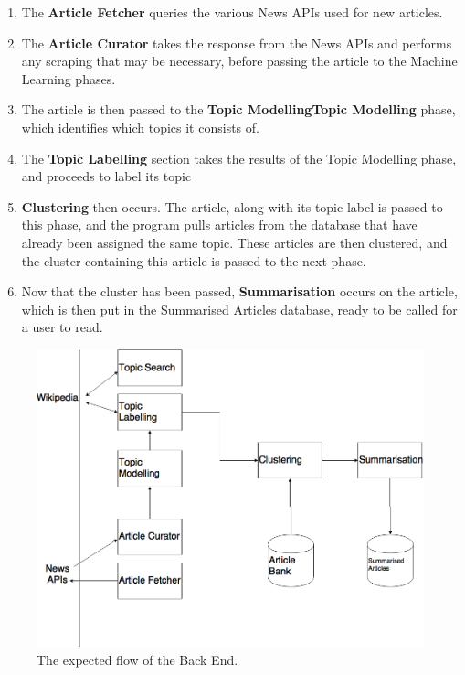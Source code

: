 \documentclass[12pt]{article}
\begin{document}
\begin{enumerate}
	\item The \textbf{Article Fetcher} queries the various News APIs used for new articles. \\
	\item The \textbf{Article Curator} takes the response from the News APIs and performs any scraping that may be necessary, before passing the article to the Machine Learning phases. \\
	\item The article is then passed to the \textbf{Topic Modelling}\textbf{Topic Modelling} phase, which identifies which topics it consists of. \\
	\item The \textbf{Topic Labelling} section takes the results of the Topic Modelling phase, and proceeds to label its topic \\
	\item \textbf{Clustering} then occurs. The article, along with its topic label is passed to this phase, and the program pulls articles from the database that have already been assigned the same topic. These articles are then clustered, and the cluster containing this article is passed to the next phase. \\
	\item Now that the cluster has been passed, \textbf{Summarisation} occurs on the article, which is then put in the Summarised Articles database, ready to be called for a user to read. \\
\end{enumerate}

\begin{figure}[ht!]
  \centering
    \includegraphics[scale=0.4]{BackEndArchitecture.png}
   \caption[A guide to the expected flow of the Back End]{The expected flow of the Back End.}
   \label{backEndArchitecture}
\end{figure}
\end{document}
